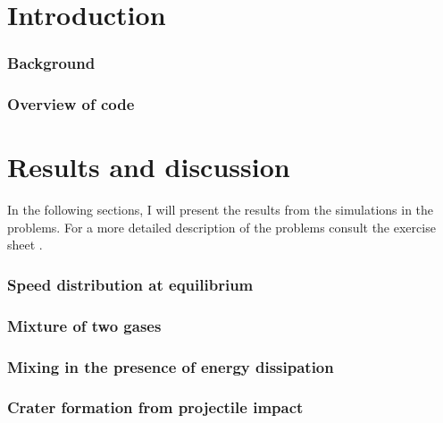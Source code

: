 \newpage
\setlength{\parskip}{0em}
\tableofcontents
\setlength{\parskip}{1em}
\newpage

\part{Introduction}
\section{Background}\label{sec:intro}



\section{Overview of code}\label{sec:overview}


\newpage
\part{Results and discussion}

In the following sections, I will present the results from the simulations in the problems. For a more detailed description of the problems consult the exercise sheet \cite{sheet}.

\section{Speed distribution at equilibrium}\label{sec:eq}



\section{Mixture of two gases}\label{sec:mix1}



\section{Mixing in the presence of energy dissipation}\label{sec:mix2}



\section{Crater formation from projectile impact}\label{sec:crater}



\newpage






